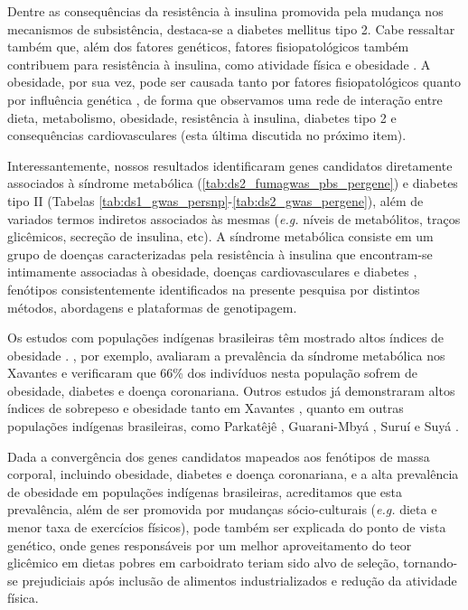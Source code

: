 Dentre as consequências da resistência à insulina promovida pela mudança nos mecanismos de subsistência, destaca-se a diabetes mellitus tipo 2. Cabe ressaltar também que, além dos fatores genéticos, fatores fisiopatológicos também contribuem para resistência à insulina, como atividade física e obesidade \cite{kahn_mechanisms_2006,ravel_polymorphisms_2012}. A obesidade, por sua vez, pode ser causada tanto por fatores fisiopatológicos quanto por influência genética \cite{haslam_obesity_2005,seravalle_obesity_2017}, de forma que observamos uma rede de interação entre dieta, metabolismo, obesidade, resistência à insulina, diabetes tipo 2 e consequências cardiovasculares (esta última discutida no próximo item).

Interessantemente, nossos resultados identificaram genes candidatos diretamente associados à síndrome metabólica (\autoref{tab:ds2_fumagwas_pbs_pergene}) e diabetes tipo II (Tabelas \ref{tab:ds1_gwas_persnp}-\ref{tab:ds2_gwas_pergene}), além de variados termos indiretos associados às mesmas (\emph{e.g.} níveis de metabólitos, traços glicêmicos, secreção de insulina, etc). A síndrome metabólica consiste em um grupo de doenças caracterizadas pela resistência à insulina que encontram-se intimamente associadas à obesidade, doenças cardiovasculares e diabetes \cite{samson_metabolic_2014}, fenótipos consistentemente identificados na presente pesquisa por distintos métodos, abordagens e plataformas de genotipagem.

Os estudos com populações indígenas brasileiras têm mostrado altos índices de obesidade \cite{soares_perfil_2015}. , por exemplo, avaliaram a prevalência da síndrome metabólica nos Xavantes e verificaram que 66\% dos indivíduos nesta população sofrem de obesidade, diabetes e doença coronariana. Outros estudos já demonstraram altos índices de sobrepeso e obesidade tanto em Xavantes \cite{leite_crescimento_2006,welch_nutrition_2009}, quanto em outras populações indígenas brasileiras, como Parkatêjê \cite{capelli_avaliacao_2001}, Guarani-Mbyá \cite{cardoso_prevalencia_2001}, Suruí \cite{lourenco_nutrition_2008} e Suyá \cite{salvo_perfil_2009}.

Dada a convergência dos genes candidatos mapeados aos fenótipos de massa corporal, incluindo obesidade, diabetes e doença coronariana, e a alta prevalência de obesidade em populações indígenas brasileiras, acreditamos que esta prevalência, além de ser promovida por mudanças sócio-culturais (\emph{e.g.} dieta e menor taxa de exercícios físicos), pode também ser explicada do ponto de vista genético, onde genes responsáveis por um melhor aproveitamento do teor glicêmico em dietas pobres em carboidrato teriam sido alvo de seleção, tornando-se prejudiciais após inclusão de alimentos industrializados e redução da atividade física.

